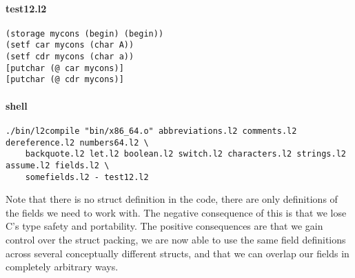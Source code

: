 \documentclass[]{article}
\let\oldparagraph\paragraph
\renewcommand{\paragraph}[1]{\oldparagraph{#1}\mbox{}}
\begin{document}
\hypertarget{test12.l2}{%
\paragraph{test12.l2}\label{test12.l2}}

\begin{verbatim}
(storage mycons (begin) (begin))
(setf car mycons (char A))
(setf cdr mycons (char a))
[putchar (@ car mycons)]
[putchar (@ cdr mycons)]
\end{verbatim}

\hypertarget{shell-11}{%
\paragraph{shell}\label{shell-11}}

\begin{verbatim}
./bin/l2compile "bin/x86_64.o" abbreviations.l2 comments.l2 dereference.l2 numbers64.l2 \
    backquote.l2 let.l2 boolean.l2 switch.l2 characters.l2 strings.l2 assume.l2 fields.l2 \
    somefields.l2 - test12.l2
\end{verbatim}

Note that there is no struct definition in the code, there are only
definitions of the fields we need to work with. The negative consequence
of this is that we lose C's type safety and portability. The positive
consequences are that we gain control over the struct packing, we are
now able to use the same field definitions across several conceptually
different structs, and that we can overlap our fields in completely
arbitrary ways.
\end{document}
